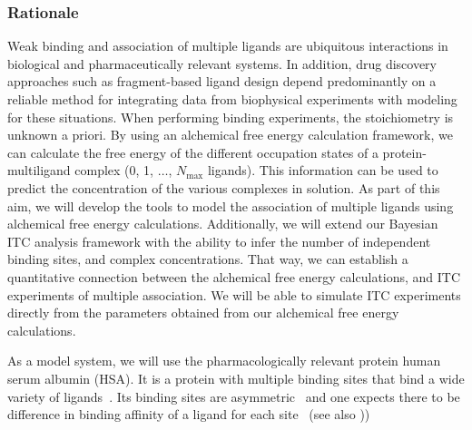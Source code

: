 \documentclass[10pt,final]{article}
\begin{document}
\subsubsection*{Rationale}
Weak binding and association of multiple ligands are ubiquitous interactions in biological and pharmaceutically relevant systems.
%
In addition, drug discovery approaches such as fragment-based ligand design depend predominantly on a reliable method for integrating data from biophysical experiments with modeling for these situations.
%
When performing binding experiments, the stoichiometry is unknown a priori.
%
By using an alchemical free energy calculation framework, we can calculate the free energy of the different occupation states of a protein-multiligand complex (0, 1, $\dots$, $N_\mathrm{max}$ ligands).
%
This information can be used to predict the concentration of the various complexes in solution.
%
As part of this aim, we will develop the tools to model the association of multiple ligands using alchemical free energy calculations.
%
Additionally, we will extend our Bayesian ITC analysis framework with the ability to infer the number of independent binding sites, and complex concentrations.
%
That way, we can establish a quantitative connection between the alchemical free energy calculations, and ITC experiments of multiple association.
%
We will be able to simulate ITC experiments directly from the parameters obtained from our alchemical free energy calculations.

As a model system, we will use the pharmacologically relevant protein human serum albumin (HSA).
%
It is a protein with multiple binding sites that bind a wide variety of ligands~\autocite{He1992a,Kragh-Hansen2002a,Sulkowska2002a}.
%
Its binding sites are asymmetric~\autocite{He1992a, Curry1998a} and one expects there to be difference in binding affinity of a ligand for each site~\autocite{Sudlow1976a} (see also ))
\end{document}
